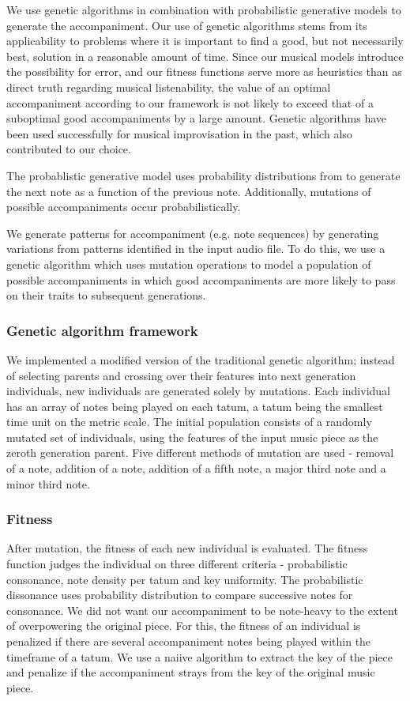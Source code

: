 \documentclass[11pt,conference,letterpaper]{IEEEtran}
\begin{document}
We use genetic algorithms in combination with probabilistic generative models to generate the accompaniment. Our use of genetic algorithms stems from its applicability to problems where it is important to find a good, but not necessarily best, solution in a reasonable amount of time. Since our musical models introduce the possibility for error, and our fitness functions serve more as heuristics than as direct truth regarding musical listenability, the value of an optimal accompaniment according to our framework is not likely to exceed that of a suboptimal good accompaniments by a large amount. Genetic algorithms have been used successfully for musical improvisation in the past, which also contributed to our choice.

The probablistic generative model uses probability distributions from \cite{tempereley2007music} to generate the next note as a function of the previous note. Additionally, mutations of possible accompaniments occur probabilistically.

We generate patterns for accompaniment (e.g. note sequences) by generating variations from patterns identified in the input audio file. To do this, we use a genetic algorithm which uses mutation operations to model a population of possible accompaniments in which good accompaniments are more likely to pass on their traits to subsequent generations.

\subsubsection{Genetic algorithm framework}

We implemented a modified version of the traditional genetic algorithm; instead of selecting parents and crossing over their features into next generation individuals, new individuals are generated solely by mutations. Each individual has an array of notes being played on each tatum, a tatum being the smallest time unit on the metric scale. The initial population consists of a randomly mutated set of individuals, using the features of the input music piece as the zeroth generation parent. Five different methods of mutation are used - removal of a note, addition of a note, addition of a fifth note, a major third note and a minor third note. 

\subsubsection{Fitness}

After mutation, the fitness of each new individual is evaluated. The fitness function judges the individual on three different criteria - probabilistic consonance, note density per tatum and key uniformity. The probabilistic dissonance uses probability distribution \cite{tempereley2007music} to compare successive notes for consonance. We did not want our accompaniment to be note-heavy to the extent of overpowering the original piece. For this, the fitness of an individual is penalized if there are several accompaniment notes being played within the timeframe of a tatum. We use a naiive algorithm to extract the key of the piece and penalize if the accompaniment strays from the key of the original music piece.
\end{document}
